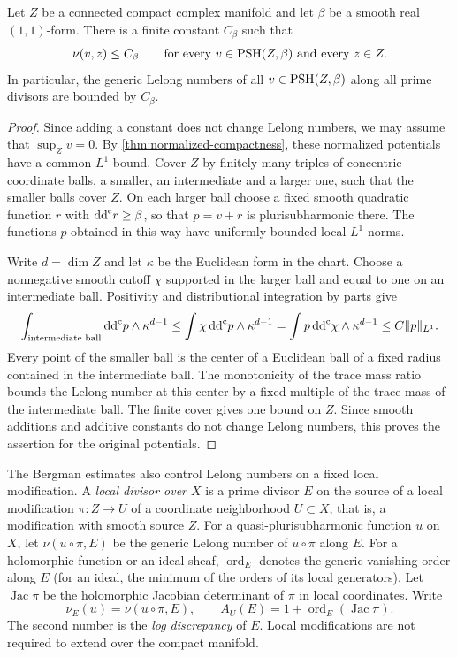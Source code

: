 \begin{lemma}\label{lem:gauduchon-uniform-lelong}
Let $Z$ be a connected compact complex manifold and let $\beta$ be a smooth real $(1,1)$-form. There is a finite constant $C_\beta$ such that
\[
 \nu(v,z)\leq C_\beta\qquad
 \text{for every }v\in\mathrm{PSH}(Z,\beta)\text{ and every }z\in Z.
\]
In particular, the generic Lelong numbers of all $v\in\mathrm{PSH}(Z,\beta)$ along all prime divisors are bounded by $C_\beta$.
\end{lemma}
\begin{proof}
Since adding a constant does not change Lelong numbers, we may assume that $\sup_Zv=0$. By \cref{thm:normalized-compactness}, these normalized potentials have a common $L^1$ bound. Cover $Z$ by finitely many triples of concentric coordinate balls, a smaller, an intermediate and a larger one, such that the smaller balls cover $Z$. On each larger ball choose a fixed smooth quadratic function $r$ with $\mathrm{dd}^{\mathrm{c}} r\geq\beta$, so that $p=v+r$ is plurisubharmonic there. The functions $p$ obtained in this way have uniformly bounded local $L^1$ norms.

Write $d=\dim Z$ and let $\kappa$ be the Euclidean form in the chart. Choose a nonnegative smooth cutoff $\chi$ supported in the larger ball and equal to one on an intermediate ball. Positivity and distributional integration by parts give
\[
 \int_{\text{intermediate ball}}\mathrm{dd}^{\mathrm{c}} p\wedge\kappa^{d-1}
 \leq\int\chi\,\mathrm{dd}^{\mathrm{c}} p\wedge\kappa^{d-1}
 =\int p\,\mathrm{dd}^{\mathrm{c}}\chi\wedge\kappa^{d-1}
 \leq C\|p\|_{L^1}.
\]
Every point of the smaller ball is the center of a Euclidean ball of a fixed radius contained in the intermediate ball. The monotonicity of the trace mass ratio \cite[Chapter~III, (5.7)--(5.8)]{DemCADG} bounds the Lelong number at this center by a fixed multiple of the trace mass of the intermediate ball. The finite cover gives one bound on $Z$. Since smooth additions and additive constants do not change Lelong numbers, this proves the assertion for the original potentials.
\end{proof}

The Bergman estimates also control Lelong numbers on a fixed local modification. A \emph{local divisor over $X$} is a prime divisor $E$ on the source of a local modification $\pi\colon Z\to U$ of a coordinate neighborhood $U\subset X$, that is, a modification with smooth source $Z$. For a quasi-plurisubharmonic function $u$ on $X$, let $\nu(u\circ\pi,E)$ be the generic Lelong number of $u\circ\pi$ along $E$. For a holomorphic function or an ideal sheaf, $\operatorname{ord}_E$ denotes the generic vanishing order along $E$ (for an ideal, the minimum of the orders of its local generators). Let $\operatorname{Jac}\pi$ be the holomorphic Jacobian determinant of $\pi$ in local coordinates. Write
\[
 \nu_E(u)=\nu(u\circ\pi,E),\qquad
 A_U(E)=1+\operatorname{ord}_E(\operatorname{Jac}\pi).
\]
The second number is the \emph{log discrepancy} of $E$. Local modifications are not required to extend over the compact manifold.


